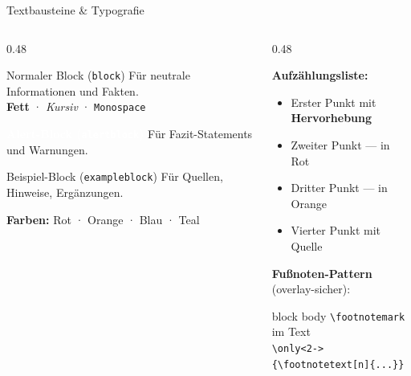 \documentclass[aspectratio=169,t,9pt]{beamer}
\begin{document}
\begin{frame}{Textbausteine \& Typografie}

	\begin{columns}[T]
		\begin{column}{0.48\textwidth}

			\begin{block}{Normaler Block (\texttt{block})}
				Für neutrale Informationen und Fakten.\\[2pt]
				\textbf{Fett} · \textit{Kursiv} · \texttt{Monospace}
			\end{block}

			\vspace{0.4em}

			\begin{alertblock}{\textcolor{white}{\textbf{Alert-Block (\texttt{alertblock})}}}
				Für Fazit-Statements und Warnungen.
			\end{alertblock}

			\vspace{0.4em}

			\begin{exampleblock}{Beispiel-Block (\texttt{exampleblock})}
				Für Quellen, Hinweise, Ergänzungen.
			\end{exampleblock}

			\vspace{0.4em}
			\textbf{Farben:}
			\textcolor{bared}{Rot} ·
			\textcolor{baorange}{Orange} ·
			\textcolor{bablue}{Blau} ·
			\textcolor{bateal}{Teal}

		\end{column}
		\begin{column}{0.48\textwidth}

			\textbf{Aufzählungsliste:}
			\begin{itemize}
				\setlength{\itemsep}{0.35em}
				\item Erster Punkt mit \textbf{Hervorhebung}
				\item Zweiter Punkt — \textcolor{bared}{in Rot}
				\item Dritter Punkt — \textcolor{baorange}{in Orange}
				\item Vierter Punkt mit Quelle\footnotemark
			\end{itemize}

			\vspace{0.5em}

			\textbf{Fußnoten-Pattern} (overlay-sicher):
			\begin{beamercolorbox}[rounded=true,shadow=false,wd=\linewidth]{block body}
				\vspace{3pt}
				\fontsize{8}{10}\selectfont
				\texttt{\textbackslash footnotemark} im Text\\[2pt]
				\texttt{\textbackslash only<2->\{\textbackslash footnotetext[n]\{...\}\}}
				\vspace{3pt}
			\end{beamercolorbox}


\end{column}
\end{columns}
\end{frame}
\end{document}

